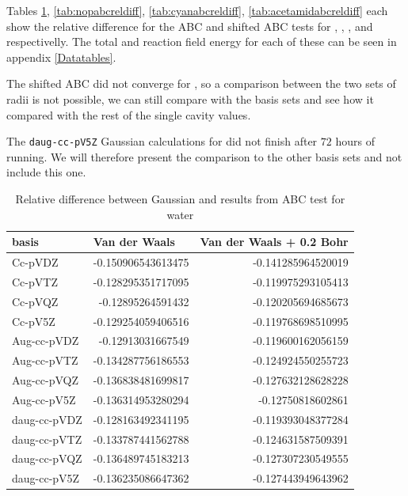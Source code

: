 \documentclass[../master_thesis.tex]{subfiles}
\begin{document}
Tables \ref{tab:watabcreldiff}, \ref{tab:nopabcreldiff}, \ref{tab:cyanabcreldiff}, \ref{tab:acetamidabcreldiff}
each show the relative difference for the \ac{ABC} and shifted \ac{ABC} tests
for , , , and  respectivelly. The
total and  reaction field energy for each of these can be seen in appendix \ref{Datatables}.

The shifted \ac{ABC} did not converge for , so a comparison between the two sets
of radii is not possible, we can still compare with the basis sets and see how it compared with
the rest of the single cavity values.

The \verb!daug-cc-pV5Z! Gaussian calculations for  did not finish
after $72$ hours of running. We will therefore present the comparison to the other
basis sets and not include this one.

\begin{table}[htbp]
\caption{Relative difference between Gaussian and \mrchem results from \ac{ABC}  test for water}
\begin{tabular}{|l|r|r|}
\hline
basis & \multicolumn{1}{l|}{Van der Waals} & \multicolumn{1}{l|}{Van der Waals + 0.2 Bohr} \\ \hline
Cc-pVDZ & -0.150906543613475 & -0.141285964520019 \\ \hline
Cc-pVTZ & -0.128295351717095 & -0.119975293105413 \\ \hline
Cc-pVQZ & -0.12895264591432 & -0.120205694685673 \\ \hline
Cc-pV5Z & -0.129254059406516 & -0.119768698510995 \\ \hline
Aug-cc-pVDZ & -0.12913031667549 & -0.119600162056159 \\ \hline
Aug-cc-pVTZ & -0.134287756186553 & -0.124924550255723 \\ \hline
Aug-cc-pVQZ & -0.136838481699817 & -0.127632128628228 \\ \hline
Aug-cc-pV5Z & -0.136314953280294 & -0.12750818602861 \\ \hline
daug-cc-pVDZ & -0.128163492341195 & -0.119393048377284 \\ \hline
daug-cc-pVTZ & -0.133787441562788 & -0.124631587509391 \\ \hline
daug-cc-pVQZ & -0.136489745183213 & -0.127307230549555 \\ \hline
daug-cc-pV5Z & -0.136235086647362 & -0.127443949643962 \\ \hline
\end{tabular}
\label{tab:watabcreldiff}
\end{table}
\end{document}
